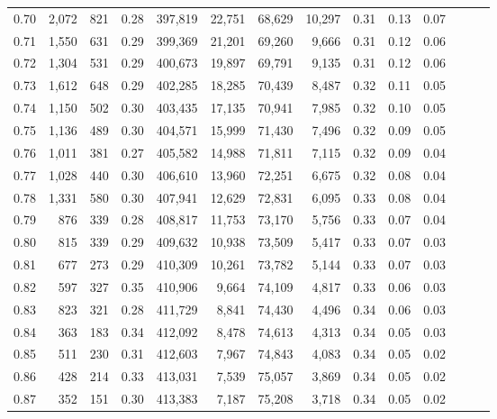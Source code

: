 \begin{tabular}{rrrrrrrrrrrrrr}
0.70 &   2,072 &    821 &  0.28 &  397,819 &   22,751 &  68,629 &  10,297 &  0.31 &  0.13 &      0.07 \\
0.71 &   1,550 &    631 &  0.29 &  399,369 &   21,201 &  69,260 &   9,666 &  0.31 &  0.12 &      0.06 \\
0.72 &   1,304 &    531 &  0.29 &  400,673 &   19,897 &  69,791 &   9,135 &  0.31 &  0.12 &      0.06 \\
0.73 &   1,612 &    648 &  0.29 &  402,285 &   18,285 &  70,439 &   8,487 &  0.32 &  0.11 &      0.05 \\
0.74 &   1,150 &    502 &  0.30 &  403,435 &   17,135 &  70,941 &   7,985 &  0.32 &  0.10 &      0.05 \\
0.75 &   1,136 &    489 &  0.30 &  404,571 &   15,999 &  71,430 &   7,496 &  0.32 &  0.09 &      0.05 \\
0.76 &   1,011 &    381 &  0.27 &  405,582 &   14,988 &  71,811 &   7,115 &  0.32 &  0.09 &      0.04 \\
0.77 &   1,028 &    440 &  0.30 &  406,610 &   13,960 &  72,251 &   6,675 &  0.32 &  0.08 &      0.04 \\
0.78 &   1,331 &    580 &  0.30 &  407,941 &   12,629 &  72,831 &   6,095 &  0.33 &  0.08 &      0.04 \\
0.79 &     876 &    339 &  0.28 &  408,817 &   11,753 &  73,170 &   5,756 &  0.33 &  0.07 &      0.04 \\
0.80 &     815 &    339 &  0.29 &  409,632 &   10,938 &  73,509 &   5,417 &  0.33 &  0.07 &      0.03 \\
0.81 &     677 &    273 &  0.29 &  410,309 &   10,261 &  73,782 &   5,144 &  0.33 &  0.07 &      0.03 \\
0.82 &     597 &    327 &  0.35 &  410,906 &    9,664 &  74,109 &   4,817 &  0.33 &  0.06 &      0.03 \\
0.83 &     823 &    321 &  0.28 &  411,729 &    8,841 &  74,430 &   4,496 &  0.34 &  0.06 &      0.03 \\
0.84 &     363 &    183 &  0.34 &  412,092 &    8,478 &  74,613 &   4,313 &  0.34 &  0.05 &      0.03 \\
0.85 &     511 &    230 &  0.31 &  412,603 &    7,967 &  74,843 &   4,083 &  0.34 &  0.05 &      0.02 \\
0.86 &     428 &    214 &  0.33 &  413,031 &    7,539 &  75,057 &   3,869 &  0.34 &  0.05 &      0.02 \\
0.87 &     352 &    151 &  0.30 &  413,383 &    7,187 &  75,208 &   3,718 &  0.34 &  0.05 &      0.02 \\

\end{tabular}
